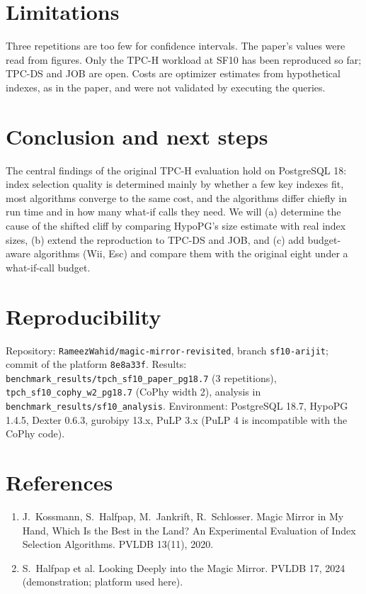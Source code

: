 \documentclass[11pt,a4paper]{article}
\begin{document}
\section{Limitations}
Three repetitions are too few for confidence intervals. The paper's values were read from figures. Only the TPC-H workload at SF10 has been reproduced so far; TPC-DS and JOB are open. Costs are optimizer estimates from hypothetical indexes, as in the paper, and were not validated by executing the queries.

\section{Conclusion and next steps}
The central findings of the original TPC-H evaluation hold on PostgreSQL 18: index selection quality is determined mainly by whether a few key indexes fit, most algorithms converge to the same cost, and the algorithms differ chiefly in run time and in how many what-if calls they need. We will (a) determine the cause of the shifted cliff by comparing HypoPG's size estimate with real index sizes, (b) extend the reproduction to TPC-DS and JOB, and (c) add budget-aware algorithms (Wii, Esc) and compare them with the original eight under a what-if-call budget.

\section*{Reproducibility}
Repository: \texttt{RameezWahid/magic-mirror-revisited}, branch \texttt{sf10-arijit}; commit of the platform \texttt{8e8a33f}. Results: \texttt{benchmark\_results/tpch\_sf10\_paper\_pg18.7} (3 repetitions), \texttt{tpch\_sf10\_cophy\_w2\_pg18.7} (CoPhy width 2), analysis in \texttt{benchmark\_results/sf10\_analysis}. Environment: PostgreSQL 18.7, HypoPG 1.4.5, Dexter 0.6.3, gurobipy 13.x, PuLP 3.x (PuLP 4 is incompatible with the CoPhy code).

\section*{References}
\begin{enumerate}\small
\item J.\ Kossmann, S.\ Halfpap, M.\ Jankrift, R.\ Schlosser. Magic Mirror in My Hand, Which Is the Best in the Land? An Experimental Evaluation of Index Selection Algorithms. PVLDB 13(11), 2020.
\item S.\ Halfpap et al. Looking Deeply into the Magic Mirror. PVLDB 17, 2024 (demonstration; platform used here).
\end{enumerate}
\end{document}
